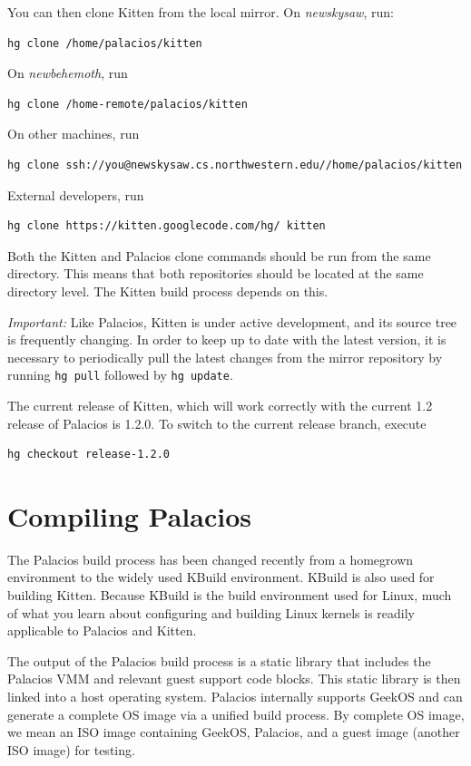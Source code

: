 \documentclass[11pt]{article}
\begin{document}
You can then clone Kitten from the local mirror.   On {\em newskysaw},
run: 
\begin{verbatim}
hg clone /home/palacios/kitten
\end{verbatim}
On {\em newbehemoth}, run
\begin{verbatim}
hg clone /home-remote/palacios/kitten
\end{verbatim}
On other machines, run
\begin{verbatim}
hg clone ssh://you@newskysaw.cs.northwestern.edu//home/palacios/kitten
\end{verbatim}
External developers, run
\begin{verbatim}
hg clone https://kitten.googlecode.com/hg/ kitten
\end{verbatim}

Both the Kitten and Palacios clone commands should be run from the
same directory. This means that both repositories should be located at
the same directory level. The Kitten build process depends on this.

{\em Important:} Like Palacios, Kitten is under active development,
and its source tree is frequently changing. In order to keep up to
date with the latest version, it is necessary to periodically pull the  
latest changes from the mirror repository by running \verb.hg pull.
followed by \verb.hg update..

The current release of Kitten, which will work correctly with the current 1.2 release of Palacios is 1.2.0. 
To switch to the current release branch, execute

\begin{verbatim}
hg checkout release-1.2.0
\end{verbatim}


\section{Compiling Palacios}

The Palacios build process has been changed recently from a homegrown
environment to the widely used KBuild environment.  KBuild is also
used for building Kitten.  Because KBuild is the build environment
used for Linux, much of what you learn about configuring and building
Linux kernels is readily applicable to Palacios and Kitten. 

The output of the Palacios build process is a static library that
includes the Palacios VMM and relevant guest support code blocks. This
static library is then linked into a host operating system. Palacios
internally supports GeekOS and can generate a complete OS image via a
unified build process.  By complete OS image, we mean an ISO image
containing GeekOS, Palacios, and a guest image (another ISO image) for
testing. 
\end{document}
